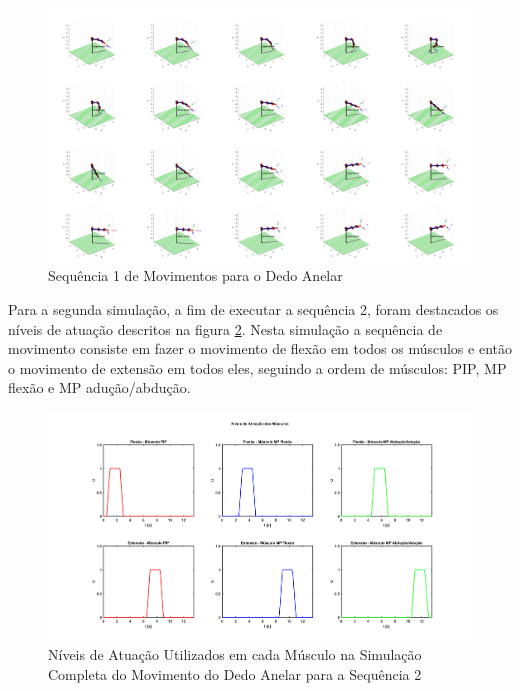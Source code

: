 \begin{figure}[H]
\centering
\includegraphics[width = 1\textwidth]{img/simulacao_sequencia_1.png}
\caption[Sequência 1 de Movimentos para o Dedo Anelar]{Sequência 1 de Movimentos para o Dedo Anelar}
\label{simulacao_sequencia_1}
\end{figure}

Para a segunda simulação, a fim de executar a sequência 2, foram destacados os níveis de atuação descritos na figura \ref{niveis_atuacao_simulacao2}. Nesta simulação a sequência de movimento consiste em fazer o movimento de flexão em todos os músculos e então o movimento de extensão em todos eles, seguindo a ordem de músculos: PIP, MP flexão e MP adução/abdução.

\begin{figure}[H]
\centering
\includegraphics[width = 1\textwidth]{img/niveis_simulacao2.png}
\caption[Níveis de Atuação Utilizados em cada Músculo na Simulação Completa do Movimento do Dedo Anelar para a Sequência 2]{Níveis de Atuação Utilizados em cada Músculo na Simulação Completa do Movimento do Dedo Anelar para a Sequência 2}
\label{niveis_atuacao_simulacao2}
\end{figure}

